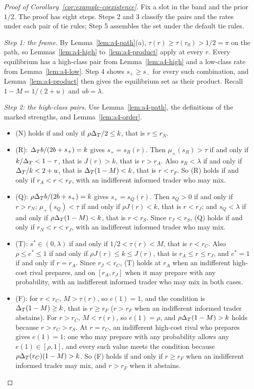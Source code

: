\begin{proof}[Proof of Corollary~\ref{cor:example-coexistence}]
Fix a slot in the band and the prior \(1/2\). The proof has eight steps. Steps 2 and 3 classify the pairs and the
rates under each pair of tie rules; Step 5 assembles the set under the default tie rules.

\emph{Step 1: the frame.} By Lemma~\ref{lem:a4-path}(a), \(\tau(r)\ge\tau(r_0)>1/2=\pi\) on the path, so
Lemmas~\ref{lem:a4-high} to~\ref{lem:a4-product} apply at every \(r\). Every equilibrium has a high-class pair
from Lemma~\ref{lem:a4-high} and a low-class rate from Lemma~\ref{lem:a4-low}. Step 4 shows \(s_+\ge s_-\) for every
such combination, and Lemma~\ref{lem:a4-product} then gives the equilibrium set as their product. Recall
\(1-M=1/(2+u)\) and \(ub=\lambda\).

\emph{Step 2: the high-class pairs.} Use Lemma~\ref{lem:a4-path}, the definitions of the marked strengths, and
Lemma~\ref{lem:a4-order}.
\begin{itemize}[leftmargin=2em]
\item (N) holds if and only if \(\rho\Delta_T/2\le k\), that is \(r\le r_N\).
\item (R): \(\Delta_T b/(2b+s_+)=k\) gives \(s_+=s_R(r)\). Then \(\mu_+(s_R)>\tau\) if and only if \(k/\Delta_T<1-\tau\), that is
\(J(r)>k\), that is \(r>r_A\). Also \(s_R<\lambda\) if and only if \(\Delta_T/k<2+u\), that is \(\Delta_T(1-M)<k\), that is
\(r<r_F\). So (R) holds if and only if \(r_A<r<r_F\), with an indifferent informed trader who may mix.
\item (Q): \(\rho\Delta_T b/(2b+s_+)=k\) gives \(s_+=s_Q(r)\). Then \(s_Q>0\) if and only if \(r>r_N\); \(\mu_+(s_Q)<\tau\) if
and only if \(\rho J(r)<k\), that is \(r<r_J\); and \(s_Q<\lambda\) if and only if \(\rho\Delta_T(1-M)<k\), that is
\(r<r_S\). Since \(r_J<r_S\), (Q) holds if and only if \(r_N<r<r_J\), with an indifferent informed trader who may mix.
\item (T): \(s^*\in(0,\lambda)\) if and only if \(1/2<\tau(r)<M\), that is \(r<r_C\). Also \(\rho\le e^*\le1\) if and
only if \(\rho J(r)\le k\le J(r)\), that is \(r_A\le r\le r_J\), and \(e^*=1\) if and only if \(r=r_A\). Since
\(r_J<r_C\), (T) holds at \(r_A\) when an indifferent high-cost rival prepares, and on \([r_A,r_J]\) when it may
prepare with any probability, with an indifferent informed trader who may mix in both cases.
\item (F): for \(r<r_C\), \(M>\tau(r)\), so \(e(1)=1\), and the condition is \(\Delta_T(1-M)\ge k\), that is \(r\ge r_F\)
(\(r>r_F\) when an indifferent informed trader abstains). For \(r>r_C\), \(M<\tau(r)\), so \(e(1)=\rho\), and
\(\rho\Delta_T(1-M)>k\) holds because \(r>r_C>r_S\). At \(r=r_C\), an indifferent high-cost rival who prepares gives
\(e(1)=1\); one who may prepare with any probability allows any \(e(1)\in[\rho,1]\), and every such value meets the
condition because \(\rho\Delta_T(r_C)(1-M)>k\). So (F) holds if and only if \(r\ge r_F\) when an indifferent informed trader may
mix, and \(r>r_F\) when it abstains.
\end{itemize}


\end{proof}
